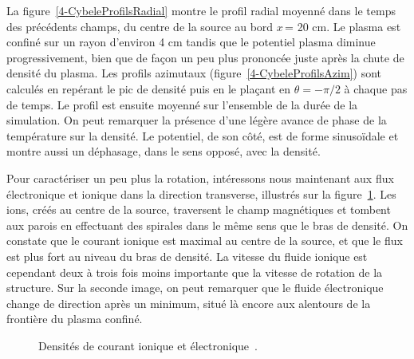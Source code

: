 \begin{refsection}
La figure~\ref{4-CybeleProfilsRadial} montre le profil radial moyenné dans le
temps des précédents champs, du centre de la source au bord $x\,$= 20 cm. Le
plasma est confiné sur un rayon d'environ 4 cm tandis que le potentiel plasma
diminue progressivement, bien que de façon un peu plus prononcée juste après la
chute de densité du plasma. 
Les profils azimutaux (figure~\ref{4-CybeleProfilsAzim})  sont calculés en
repérant le pic de densité puis en le plaçant en $\theta=-\pi/2$ à chaque pas de temps. Le profil
est ensuite moyenné sur l'ensemble de la durée de la simulation.
On peut remarquer la présence d'une légère avance de phase de la température
sur la densité. Le potentiel, de son côté, est de forme sinusoïdale et montre
aussi un déphasage, dans le sens opposé, avec la densité.

Pour caractériser un peu plus la rotation, intéressons nous
maintenant aux flux électronique et ionique dans la direction
transverse, illustrés sur la figure~\ref{4-CybeleCarteFlux}.
Les ions, créés au centre de la source, traversent le champ magnétiques et
tombent aux parois en effectuant des spirales dans le même sens que le bras de
densité. On constate que le courant ionique est maximal au centre de la source,
et que le flux est plus fort au niveau du bras de densité. La
vitesse du fluide ionique est cependant deux à trois fois moins importante que la vitesse de rotation de
la structure. Sur la seconde image, on peut remarquer que le fluide électronique
change de direction après un minimum, situé là encore aux alentours de la
frontière du plasma confiné.

\begin{figure}[!htbp]
  \centering
    \caption{Densités de courant ionique
     et électronique~.}
    \label{4-CybeleCarteFlux}
\end{figure}


\end{refsection}

